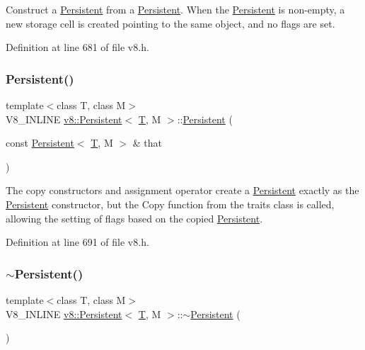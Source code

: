 Construct a \mbox{\hyperlink{classv8_1_1Persistent}{Persistent}} from a \mbox{\hyperlink{classv8_1_1Persistent}{Persistent}}. When the \mbox{\hyperlink{classv8_1_1Persistent}{Persistent}} is non-\/empty, a new storage cell is created pointing to the same object, and no flags are set. 

Definition at line 681 of file v8.\+h.

\mbox{\label{classv8_1_1Persistent_a22331e91572784cd5ed5519739bb50c7}} 
\subsubsection{\texorpdfstring{Persistent()}{Persistent()}\hspace{0.1cm}{\footnotesize\ttfamily [4/4]}}
{\footnotesize\ttfamily template$<$class T, class M$>$ \\
V8\+\_\+\+I\+N\+L\+I\+NE \mbox{\hyperlink{classv8_1_1Persistent}{v8\+::\+Persistent}}$<$ \mbox{\hyperlink{classv8_1_1internal_1_1torque_1_1T}{T}}, M $>$\+::\mbox{\hyperlink{classv8_1_1Persistent}{Persistent}} (\begin{DoxyParamCaption}\item[{const \mbox{\hyperlink{classv8_1_1Persistent}{Persistent}}$<$ \mbox{\hyperlink{classv8_1_1internal_1_1torque_1_1T}{T}}, M $>$ \&}]{that }\end{DoxyParamCaption})\hspace{0.3cm}{\ttfamily [inline]}}

The copy constructors and assignment operator create a \mbox{\hyperlink{classv8_1_1Persistent}{Persistent}} exactly as the \mbox{\hyperlink{classv8_1_1Persistent}{Persistent}} constructor, but the Copy function from the traits class is called, allowing the setting of flags based on the copied \mbox{\hyperlink{classv8_1_1Persistent}{Persistent}}. 

Definition at line 691 of file v8.\+h.

\mbox{\label{classv8_1_1Persistent_a7d4d2bebfe3919e447e22adc15464e25}} 
\subsubsection{\texorpdfstring{$\sim$\+Persistent()}{~Persistent()}}
{\footnotesize\ttfamily template$<$class T, class M$>$ \\
V8\+\_\+\+I\+N\+L\+I\+NE \mbox{\hyperlink{classv8_1_1Persistent}{v8\+::\+Persistent}}$<$ \mbox{\hyperlink{classv8_1_1internal_1_1torque_1_1T}{T}}, M $>$\+::$\sim$\mbox{\hyperlink{classv8_1_1Persistent}{Persistent}} (\begin{DoxyParamCaption}{ }\end{DoxyParamCaption})\hspace{0.3cm}{\ttfamily [inline]}}


